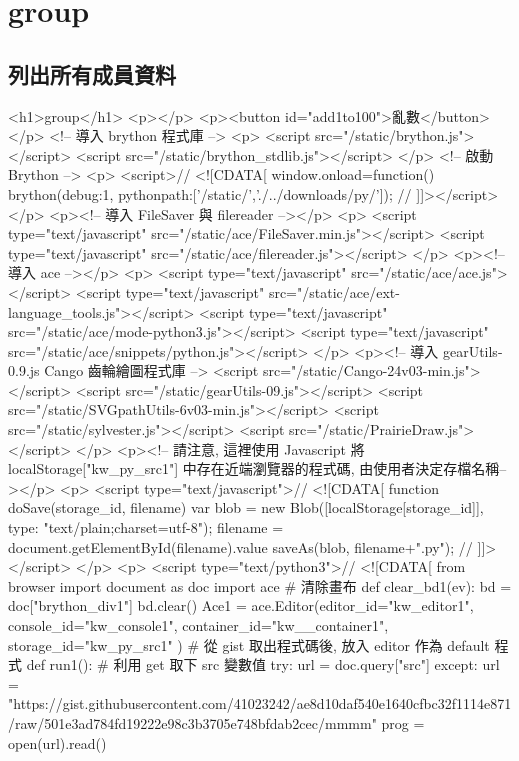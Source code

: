 \chapter{group}
\section{列出所有成員資料}
<h1>group</h1>
<p></p>
<p><button id="add1to100">亂數</button></p>
<!-- 導入 brython 程式庫 -->
<p>
<script src="/static/brython.js"></script>
<script src="/static/brython_stdlib.js"></script>
</p>
<!-- 啟動 Brython -->
<p>
<script>// <![CDATA[
window.onload=function(){
brython({debug:1, pythonpath:['/static/','./../downloads/py/']});
}
// ]]></script>
</p>
<p><!-- 導入 FileSaver 與 filereader --></p>
<p>
<script type="text/javascript" src="/static/ace/FileSaver.min.js"></script>
<script type="text/javascript" src="/static/ace/filereader.js"></script>
</p>
<p><!-- 導入 ace --></p>
<p>
<script type="text/javascript" src="/static/ace/ace.js"></script>
<script type="text/javascript" src="/static/ace/ext-language_tools.js"></script>
<script type="text/javascript" src="/static/ace/mode-python3.js"></script>
<script type="text/javascript" src="/static/ace/snippets/python.js"></script>
</p>
<p><!-- 導入 gearUtils-0.9.js Cango 齒輪繪圖程式庫 -->
<script src="/static/Cango-24v03-min.js"></script>
<script src="/static/gearUtils-09.js"></script>
<script src="/static/SVGpathUtils-6v03-min.js"></script>
<script src="/static/sylvester.js"></script>
<script src="/static/PrairieDraw.js"></script>
</p>
<p><!-- 請注意, 這裡使用 Javascript 將 localStorage["kw_py_src1"] 中存在近端瀏覽器的程式碼, 由使用者決定存檔名稱--></p>
<p>
<script type="text/javascript">// <![CDATA[
function doSave(storage_id, filename){
    var blob = new Blob([localStorage[storage_id]], {type: "text/plain;charset=utf-8"});
    filename = document.getElementById(filename).value
    saveAs(blob, filename+".py");
}
// ]]></script>
</p>
<p>
<script type="text/python3">// <![CDATA[
from browser import document as doc
import ace
# 清除畫布
def clear_bd1(ev):
    bd = doc["brython_div1"]
    bd.clear()
Ace1 = ace.Editor(editor_id="kw_editor1", console_id="kw_console1", container_id="kw__container1", storage_id="kw_py_src1" )
# 從 gist 取出程式碼後, 放入 editor 作為 default 程式
def run1():
    # 利用 get 取下 src 變數值
    try:
        url = doc.query["src"]
    except:
        url = "https://gist.githubusercontent.com/41023242/ae8d10daf540e1640cfbc32f1114e871/raw/501e3ad784fd19222e98c3b3705e748bfdab2cec/mmmm"
    prog = open(url).read()

